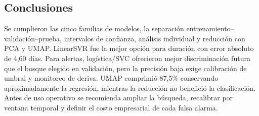 \documentclass[journal]{IEEEtran}
\begin{document}
\subsection{Conclusiones}
Se cumplieron las cinco familias de modelos, la separación entrenamiento--validación--prueba, intervalos de confianza, análisis individual y reducción con PCA y UMAP. LinearSVR fue la mejor opción para duración con error absoluto de 4,60 días. Para alertas, logística/SVC ofrecieron mejor discriminación futura que el bosque elegido en validación, pero la precisión baja exige calibración de umbral y monitoreo de deriva. UMAP comprimió 87,5\% conservando aproximadamente la regresión, mientras la reducción no benefició la clasificación. Antes de uso operativo se recomienda ampliar la búsqueda, recalibrar por ventana temporal y definir el costo empresarial de cada falsa alarma.



\end{document}
